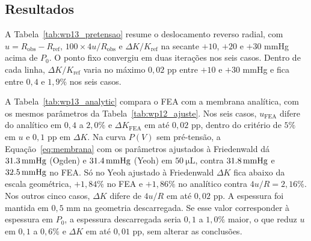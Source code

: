 \subsection{Resultados}

A Tabela~\ref{tab:wp13_pretensao} resume o deslocamento reverso radial, com $u=R_{\text{obs}}-R_{\text{ref}}$, $100\times4u/R_{\text{obs}}$ e $\Delta K/K_{\text{ref}}$ na secante $+10$, $+20$ e $+30$ mmHg acima de $P_0$. O ponto fixo convergiu em duas iterações nos seis casos. Dentro de cada linha, $\Delta K/K_{\text{ref}}$ varia no máximo $0{,}02$ pp entre $+10$ e $+30$ mmHg e fica entre $0{,}4$ e $1{,}9\%$ nos seis casos.

A Tabela~\ref{tab:wp13_analytic} compara o FEA com a membrana analítica, com os mesmos parâmetros da Tabela~\ref{tab:wp12_ajuste}. Nos seis casos, $u_{\text{FEA}}$ difere do analítico em $0{,}4$ a $2{,}0\%$ e $\Delta K_{\text{FEA}}$ em até $0{,}02$ pp, dentro do critério de $5\%$ em $u$ e $0{,}1$ pp em $\Delta K$. Na curva $P(V)$ sem pré-tensão, a Equação~\ref{eq:membrana} com os parâmetros ajustados à Friedenwald dá $\SI{31{,}3}{\milli\meter Hg}$ (Ogden) e $\SI{31{,}4}{\milli\meter Hg}$ (Yeoh) em $\SI{50}{\micro\liter}$, contra $\SI{31{,}8}{\milli\meter Hg}$ e $\SI{32{,}5}{\milli\meter Hg}$ no FEA. Só no Yeoh ajustado à Friedenwald $\Delta K$ fica abaixo da escala geométrica, $+1{,}84\%$ no FEA e $+1{,}86\%$ no analítico contra $4u/R=2{,}16\%$. Nos outros cinco casos, $\Delta K$ difere de $4u/R$ em até $0{,}02$ pp. A espessura foi mantida em $0{,}5$ mm na geometria descarregada. Se esse valor corresponder à espessura em $P_0$, a espessura descarregada seria $0{,}1$ a $1{,}0\%$ maior, o que reduz $u$ em $0{,}1$ a $0{,}6\%$ e $\Delta K$ em até $0{,}01$ pp, sem alterar as conclusões.

